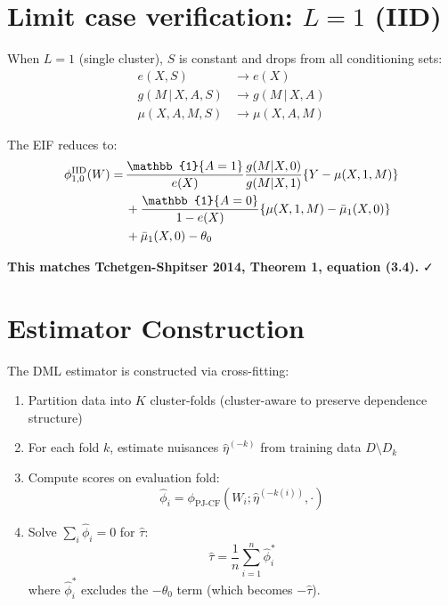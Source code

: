 \documentclass[11pt]{article}
\theoremstyle{plain}
\theoremstyle{definition}
\theoremstyle{remark}
\newcommand{\given}{\,|\,}
\newcommand{\ind}{\mathbb{1}}
\begin{document}
\section{Limit case verification: $L = 1$ (IID)}
\label{sec:iid-limit}

When $L = 1$ (single cluster), $S$ is constant and drops from all conditioning sets:
\begin{align}
    e(X, S) &\to e(X) \\
    g(M \given X, A, S) &\to g(M \given X, A) \\
    \mu(X, A, M, S) &\to \mu(X, A, M)
\end{align}

The EIF reduces to:
\begin{align}
    \phi_{1,0}^{\text{IID}}(W) =\,& \frac{\ind\{A=1\}}{e(X)} \frac{g(M|X,0)}{g(M|X,1)} \{Y - \mu(X,1,M)\} \notag\\
    &+\frac{\ind\{A=0\}}{1-e(X)}\{\mu(X,1,M) - \bar\mu_1(X,0)\} \notag \\
    &+ \bar\mu_1(X,0) - \theta_0
\end{align}

\textbf{This matches Tchetgen-Shpitser 2014, Theorem 1, equation (3.4).} ✓

\section{Estimator Construction}
\label{sec:estimator}

The DML estimator is constructed via cross-fitting:

\begin{enumerate}[itemsep=4pt]
    \item Partition data into $K$ cluster-folds (cluster-aware to preserve dependence structure)
    \item For each fold $k$, estimate nuisances $\hat\eta^{(-k)}$ from training data $D \setminus D_k$
    \item Compute scores on evaluation fold:
    \begin{equation}
        \hat\phi_i = \phi_{\text{PJ-CF}}(W_i; \hat\eta^{(-k(i))}, \cdot)
    \end{equation}
    \item Solve $\sum_i \hat\phi_i = 0$ for $\hat\tau$:
    \begin{equation}
        \hat\tau = \frac{1}{n} \sum_{i=1}^n \hat\phi_i^*
    \end{equation}
    where $\hat\phi_i^*$ excludes the $-\theta_0$ term (which becomes $-\hat\tau$).
\end{enumerate}
\end{document}
